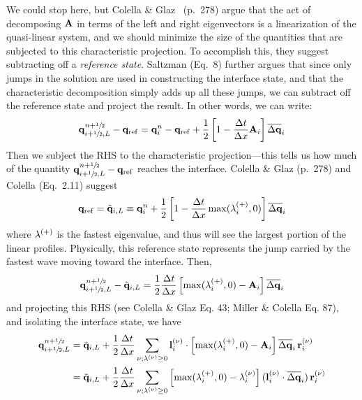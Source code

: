 We could stop here, but Colella \& Glaz~\cite{colellaglaz:1985}
(p.\ 278) argue that the act of decomposing ${\bf A}$ in terms of the left
and right eigenvectors is a linearization of the quasi-linear system,
and we should minimize the size of the quantities that are subjected
to this characteristic projection.  To accomplish this, they suggest
subtracting off a {\em reference state}.  Saltzman (Eq.\ 8) further
argues that since only jumps in the solution are used in constructing
the interface state, and that the characteristic decomposition simply adds
up all these jumps, we can subtract off the reference state and
project the result.  In other words, we can write:
\begin{equation}
{\bf q}_{i+{\sfrac{1}{2}},L}^{n+{\sfrac{1}{2}}} - {\bf q}_\mathrm{ref} = {\bf q}_i^n - {\bf q}_\mathrm{ref} +
  \frac{1}{2} \left [ 1 - \frac{\Delta t}{\Delta x} {\bf A}_i \right ] \overline{\Delta {\bf q}}_i
\label{eq:lin_decomp}
\end{equation}
Then we subject the RHS to the characteristic projection---this tells
us how much of the quantity ${\bf q}_{i+{\sfrac{1}{2}},L}^{n+{\sfrac{1}{2}}} - {\bf q}_\mathrm{ref}$
reaches the interface.  Colella \& Glaz (p.\ 278) and Colella
(Eq.\ 2.11) suggest
\begin{equation}
{\bf q}_\mathrm{ref} = \tilde{{\bf q}}_{i,L} \equiv {\bf q}_i^n +
   \frac{1}{2} \left [ 1 - \frac{\Delta t}{\Delta x}
 \max(\lambda_i^{(+)}, 0) \right ] \overline{\Delta {\bf q}}_i \label{eq:qref}
\end{equation}
where $\lambda^{(+)}$ is the fastest eigenvalue, and thus will see
the largest portion of the linear profiles.  Physically, this
reference state represents the jump carried by the fastest wave
moving toward the interface.  Then,
\begin{equation}
{\bf q}_{i+{\sfrac{1}{2}},L}^{n+{\sfrac{1}{2}}} - \tilde{{\bf q}}_{i,L} = \frac{1}{2} \frac{\Delta t}{\Delta x}
  \left [ \max(\lambda_i^{(+)},0) - {\bf A}_i \right ] \overline{\Delta {\bf q}}_i
\end{equation}
and projecting this RHS (see Colella \& Glaz Eq. 43; Miller \& Colella Eq. 87),
and isolating the interface state, we have
\begin{align}
{\bf q}_{i+{\sfrac{1}{2}},L}^{n+{\sfrac{1}{2}}} &= \tilde{{\bf q}}_{i,L} + \frac{1}{2} \frac{\Delta t}{\Delta x}
       \sum_{\nu; \lambda^{(\nu)} \ge 0} {\bf l}_i^{(\nu)} \cdot \left [ \max(\lambda_i^{(+)},0) - {\bf A}_i \right ]
                                           \overline{\Delta {\bf q}}_i \, {\bf r}_i^{(\nu)} \\
                    &= \tilde{{\bf q}}_{i,L} + \frac{1}{2} \frac{\Delta t}{\Delta x}
       \sum_{\nu; \lambda^{(\nu)} \ge 0} \left [ \max(\lambda_i^{(+)},0) - \lambda_i^{(\nu)} \right ]
                                          ({\bf l}_i^{(\nu)} \cdot \overline{\Delta {\bf q}}_i) \, {\bf r}_i^{(\nu)}
\end{align}
